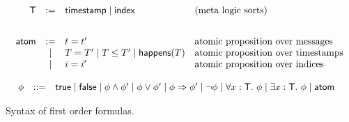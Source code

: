 \begin{figure}
  \[
  \begin{array}{c}
   \begin{array}{rcll}
    \textsf{T} &  := & \textsf{timestamp} \mid \textsf{index} & \text{(meta logic sorts)} \\
    \\[2ex]
   \textsf{atom} & := & t=t'
 & \text{atomic proposition over messages } \\
  &\mid & T=T' \mid T \leq T' \mid \textsf{happens}(T) &  \text{atomic proposition
  over timestamps } \\
  &\mid & i=i'  &  \text{atomic proposition
    over indices } \\
    \end{array}
\\
\\
     \begin{array}{rcll}
    \phi & ::= &  \textsf{true} \mid \textsf{false} \mid \phi \wedge \phi' \mid  \phi
    \vee \phi' \mid   \phi \Rightarrow \phi'\mid \neg \phi \mid
    \forall x : \textsf{T}.\ \phi \mid \exists x:\textsf{T}.\ \phi \mid \textsf{atom} &
    \end{array}

\end{array}
    \]
    \caption{Syntax of first order formulas.}\label{fig:syntax}
\end{figure}

